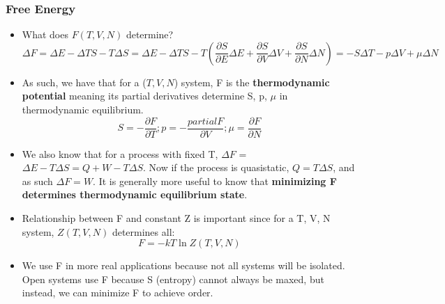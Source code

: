 \documentclass[12pt, letterpaper, twoside]{article}
\begin{document}
\subsubsection{Free Energy}

\begin{itemize}
    \item What does $F(T,V,N)$ determine?
    \begin{equation*}
        \Delta F = \Delta E - \Delta TS - T\Delta S = \Delta E - \Delta TS - T(\frac{\partial S}{\partial E}\Delta E + \frac{\partial S}{\partial V}\Delta V + \frac{\partial S}{\partial N} \Delta N) = -S\Delta T - p\Delta V + \mu\Delta N
    \end{equation*}
    \item As such, we have that for a ($T, V, N$) system, F is the \textbf{thermodynamic potential} meaning its partial derivatives determine S, p, $\mu$ in thermodynamic equilibrium.
    \begin{equation*}
        S = -\frac{\partial F}{\partial T}; p = -\frac{partial F}{\partial V}; \mu = \frac{\partial F}{\partial N}
    \end{equation*}
    \item We also know that for a process with fixed T, $\Delta F$ = $\Delta E - T\Delta S = Q + W - T\Delta S$. Now if the process is quasistatic, $Q = T\Delta S$, and as such $\Delta F = W$.  It is generally more useful to know that \textbf{minimizing F determines thermodynamic equilibrium state}.
    \item Relationship between F and constant Z is important since for a T, V, N system, $Z(T,V,N)$ determines all:
    \begin{equation}
        F = -kT\ln{Z(T,V,N)}
    \end{equation}
    \item We use F in more real applications because not all systems will be isolated. Open systems use F because S (entropy) cannot always be maxed, but instead, we can minimize F to achieve order.
\end{itemize}
\end{document}

